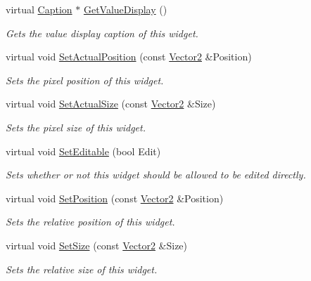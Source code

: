 \begin{DoxyCompactItemize}
virtual \hyperlink{classMezzanine_1_1UI_1_1Caption}{Caption} $\ast$ \hyperlink{classMezzanine_1_1UI_1_1Spinner_a10594250c750f27b7862ec339d656880}{GetValueDisplay} ()
\begin{DoxyCompactList}\small\item\em Gets the value display caption of this widget. \item\end{DoxyCompactList}\item 
virtual void \hyperlink{classMezzanine_1_1UI_1_1Spinner_ac90f7a00e8a9c2f14ddb3053f89ecd2c}{SetActualPosition} (const \hyperlink{classMezzanine_1_1Vector2}{Vector2} \&Position)
\begin{DoxyCompactList}\small\item\em Sets the pixel position of this widget. \item\end{DoxyCompactList}\item 
virtual void \hyperlink{classMezzanine_1_1UI_1_1Spinner_a4154b6a0c11891a0c1be3b1d03477ba1}{SetActualSize} (const \hyperlink{classMezzanine_1_1Vector2}{Vector2} \&Size)
\begin{DoxyCompactList}\small\item\em Sets the pixel size of this widget. \item\end{DoxyCompactList}\item 
virtual void \hyperlink{classMezzanine_1_1UI_1_1Spinner_a4604e32ece42fefc5739584e4754f636}{SetEditable} (bool Edit)
\begin{DoxyCompactList}\small\item\em Sets whether or not this widget should be allowed to be edited directly. \item\end{DoxyCompactList}\item 
virtual void \hyperlink{classMezzanine_1_1UI_1_1Spinner_acb64ee82819e3fc46afd24926e18fc83}{SetPosition} (const \hyperlink{classMezzanine_1_1Vector2}{Vector2} \&Position)
\begin{DoxyCompactList}\small\item\em Sets the relative position of this widget. \item\end{DoxyCompactList}\item 
virtual void \hyperlink{classMezzanine_1_1UI_1_1Spinner_a11b2783e59b585b30f4b5ae36cfd7f93}{SetSize} (const \hyperlink{classMezzanine_1_1Vector2}{Vector2} \&Size)
\begin{DoxyCompactList}\small\item\em Sets the relative size of this widget. \item\end{DoxyCompactList}\item 

\end{DoxyCompactItemize}
